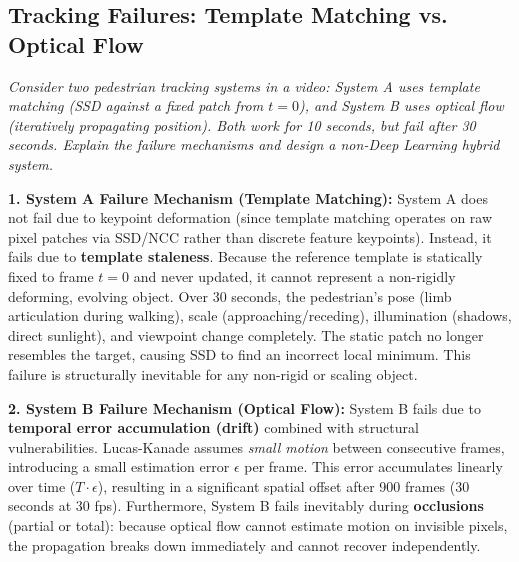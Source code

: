 \subsection{Tracking Failures: Template Matching vs. Optical Flow}
\textit{Consider two pedestrian tracking systems in a video: System A uses template matching (SSD against a fixed patch from $t=0$), and System B uses optical flow (iteratively propagating position). Both work for 10 seconds, but fail after 30 seconds. Explain the failure mechanisms and design a non-Deep Learning hybrid system.}

\textbf{1. System A Failure Mechanism (Template Matching):}
System A does not fail due to keypoint deformation (since template matching operates on raw pixel patches via SSD/NCC rather than discrete feature keypoints). Instead, it fails due to \textbf{template staleness}. Because the reference template is statically fixed to frame $t=0$ and never updated, it cannot represent a non-rigidly deforming, evolving object. Over 30 seconds, the pedestrian's pose (limb articulation during walking), scale (approaching/receding), illumination (shadows, direct sunlight), and viewpoint change completely. The static patch no longer resembles the target, causing SSD to find an incorrect local minimum. This failure is structurally inevitable for any non-rigid or scaling object.

\textbf{2. System B Failure Mechanism (Optical Flow):}
System B fails due to \textbf{temporal error accumulation (drift)} combined with structural vulnerabilities. Lucas-Kanade assumes \textit{small motion} between consecutive frames, introducing a small estimation error $\epsilon$ per frame. This error accumulates linearly over time ($T \cdot \epsilon$), resulting in a significant spatial offset after 900 frames (30 seconds at 30 fps). Furthermore, System B fails inevitably during \textbf{occlusions} (partial or total): because optical flow cannot estimate motion on invisible pixels, the propagation breaks down immediately and cannot recover independently.

